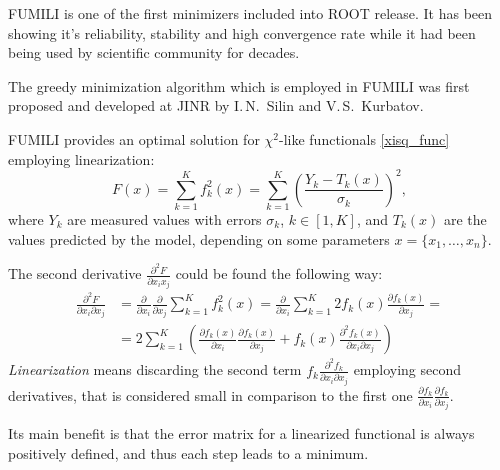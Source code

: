 
FUMILI is one of the first minimizers included into ROOT release.
It has been showing it's reliability, stability and high convergence rate while it had been being used by scientific community for decades.

The greedy minimization algorithm which is employed in FUMILI was first proposed and developed at JINR by I.\,N.~Silin and V.\,S.~Kurbatov.

FUMILI provides an optimal solution for $\chi^2$-like functionals \eqref{xisq_func} employing linearization:
\begin{equation}
\label{xisq_func}
F(x) = \sum_{k=1}^K f_k^2(x) = \sum_{k=1}^K\left(\frac{Y_k - T_k(x)}{\sigma_k} \right)^2,
\end{equation}
where $Y_k$ are measured values with errors $\sigma_k$, $k \in [1, K]$, and $T_k(x)$ are the values predicted by the model, depending on some parameters $x = \{x_1, \ldots, x_n\}$.

The second derivative $\displaystyle\frac{\partial^2 F}{\partial x_i x_j}$ could be found the following way:
\begin{equation}
\begin{aligned}
\frac{\partial^2 F}{\partial x_i \partial x_j} &= \frac{\partial}{\partial x_i}\frac{\partial}{\partial x_j} \sum_{k=1}^K f_k^2(x) = \frac{\partial}{\partial x_i}\sum_{k=1}^K 2 f_k(x) \frac{\partial f_k(x)}{\partial x_j} = \\
&= 2 \sum_{k=1}^K \left( \frac{\partial f_k(x)}{\partial x_i}\frac{\partial f_k(x)}{\partial x_j} + f_k(x) \frac{\partial^2 f_k(x)}{\partial x_i \partial x_j} \right)
\end{aligned}
\end{equation}
\emph{Linearization} means discarding the second term $\displaystyle f_k\frac{\partial^2 f_k}{\partial x_i \partial x_j}$ employing second derivatives, that is considered small in comparison to the first one $\displaystyle\frac{\partial f_k}{\partial x_i}\frac{\partial f_k}{\partial x_j}$.

Its main benefit is that the error matrix for a linearized functional is always positively defined, and thus each step leads to a minimum.


